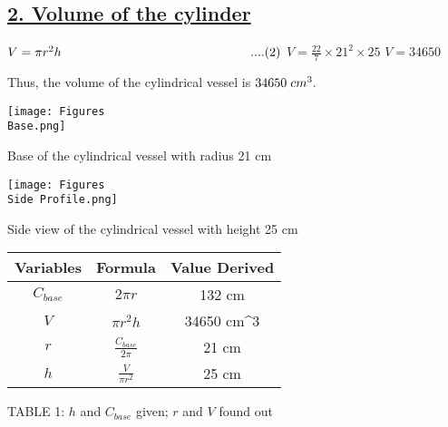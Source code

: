 \documentclass[journal,12pt,twocolumn]{IEEEtran}
\begin{document}
\subsection*{\underline{\textbf{2. Volume of the cylinder}}}
\newline
$V = \pi{r^2h}\hspace{5.25cm}....(2)$
\newline
$V = \frac{22}{7}\times21^2\times25$
\newline
$V = 34650$
\vspace{1mm}
\begin{center}
    {Thus, the volume of the cylindrical vessel is $34650 \hspace{1mm} cm^3.$}
\end{center}
\texttt{[image: Figures\\Base.png]}
\begin{center}
Base of the cylindrical vessel with radius 21 cm
\end{center}
\texttt{[image: Figures\\Side Profile.png]}
\begin{center}
Side view of the cylindrical vessel with height 25 cm
\end{center}
\vspace{7mm}
\begin{center}
\begin{tabular}{|c|c|c|}
\hline
Variables & Formula & Value Derived  \\
\hline \hline
$C_{base}$ & $2\pi r$ & 132 cm \\
\hline
$V$ & $\pi r^2h$ & 34650 cm^3 \\
\hline
$r$ & $\frac{C_{base}}{2\pi}$ & 21 cm \\
\hline
$h$ & $\frac{V}{\pi r^2}$ & 25 cm \\
\hline
\end{tabular}
\vspace{5mm}
\end{center}
\begin{center}
\caption{TABLE 1: $h$ and $C_{base}$ given; $r$ and $V$ found out}
\end{center}
\end{document}
